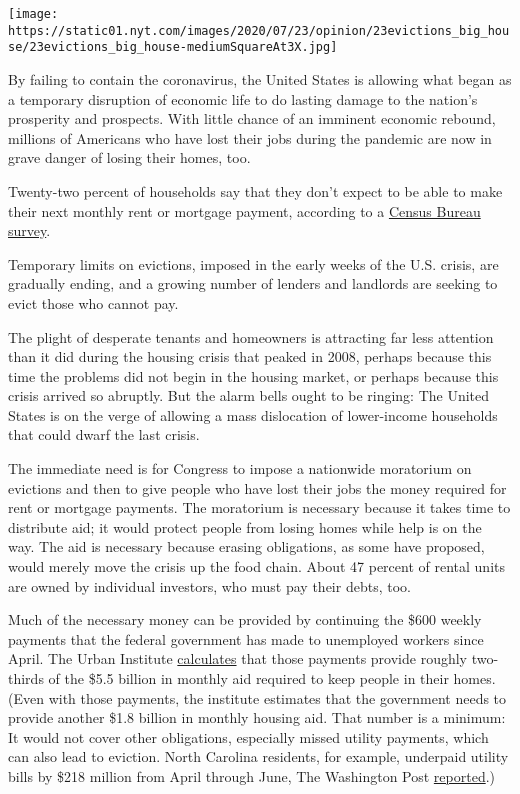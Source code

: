 \texttt{[image: https://static01.nyt.com/images/2020/07/23/opinion/23evictions\_big\_house/23evictions\_big\_house-mediumSquareAt3X.jpg]}

By failing to contain the coronavirus, the United States is allowing
what began as a temporary disruption of economic life to do lasting
damage to the nation's prosperity and prospects. With little chance of
an imminent economic rebound, millions of Americans who have lost their
jobs during the pandemic are now in grave danger of losing their homes,
too.

Twenty-two percent of households say that they don't expect to be able
to make their next monthly rent or mortgage payment, according to a
\href{https://www.census.gov/householdpulsedata}{Census Bureau survey}.

Temporary limits on evictions, imposed in the early weeks of the U.S.
crisis, are gradually ending, and a growing number of lenders and
landlords are seeking to evict those who cannot pay.

The plight of desperate tenants and homeowners is attracting far less
attention than it did during the housing crisis that peaked in 2008,
perhaps because this time the problems did not begin in the housing
market, or perhaps because this crisis arrived so abruptly. But the
alarm bells ought to be ringing: The United States is on the verge of
allowing a mass dislocation of lower-income households that could dwarf
the last crisis.

The immediate need is for Congress to impose a nationwide moratorium on
evictions and then to give people who have lost their jobs the money
required for rent or mortgage payments. The moratorium is necessary
because it takes time to distribute aid; it would protect people from
losing homes while help is on the way. The aid is necessary because
erasing obligations, as some have proposed, would merely move the crisis
up the food chain. About 47 percent of rental units are owned by
individual investors, who must pay their debts, too.

Much of the necessary money can be provided by continuing the \$600
weekly payments that the federal government has made to unemployed
workers since April. The Urban Institute
\href{https://www.urban.org/research/publication/how-much-assistance-needed-support-renters-through-covid-19-crisis}{calculates}
that those payments provide roughly two-thirds of the \$5.5 billion in
monthly aid required to keep people in their homes. (Even with those
payments, the institute estimates that the government needs to provide
another \$1.8 billion in monthly housing aid. That number is a minimum:
It would not cover other obligations, especially missed utility
payments, which can also lead to eviction. North Carolina residents, for
example, underpaid utility bills by \$218 million from April through
June, The Washington Post
\href{https://www.washingtonpost.com/business/2020/07/23/north-carolina-utility-bills-coronavirus/?hpid=hp_hp-top-table-high_bailoutnorthcarolina-1215pm\%3Ahomepage\%2Fstory-ans}{reported}.)

